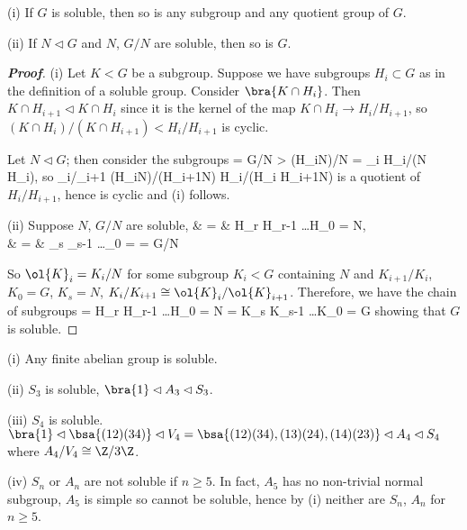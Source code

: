 \begin{proposition}
\ben
\item [(i)] If $G$ is soluble, then so is any subgroup and any quotient group of $G$.
\item [(ii)] If $N \lhd G$ and $N$, $G/N$ are soluble, then so is $G$.
\een
\end{proposition}

\begin{proof}[\bf Proof]
\ben
\item [(i)] Let $K < G$ be a subgroup. Suppose we have subgroups $H_i \subset G$ as in the definition of a soluble group. Consider $\bra{K \cap H_i}$. Then $K \cap H_{i+1} \lhd K \cap H_i$ since it is the kernel of the map $K \cap H_i \to H_i/H_{i+1}$, so $(K \cap H_i)/(K \cap H_{i+1}) < H_i/H_{i+1}$ is cyclic.

Let $N \lhd G$; then consider the subgroups
\be
{} = G/N > (H_iN)/N = _i \cong H_i/(N \cap H_i),
\ee
so
\be
{}_i/_{i+1} \cong (H_iN)/(H_{i+1}N) \cong H_i/(H_i \cap H_{i+1}N)
\ee
is a quotient of $H_i/H_{i+1}$, hence is cyclic and (i) follows.

\item [(ii)] Suppose $N$, $G/N$ are soluble,
\beast
{} & = & H_r \lhd H_{r-1} \lhd \dots \lhd H_0 = N,\\
 & = & _s \lhd {}_{s-1} \lhd \dots {}_0 =  = G/N
\eeast

So $\ol{K}_i = K_i/N$ for some subgroup $K_i < G$ containing $N$ and $K_{i+1} / K_i$, $K_0 = G$, $K_s = N$, $K_i/K_{i+1} \cong \ol{K}_i/\ol{K}_{i+1}$. Therefore, we have the chain of subgroups
\be
{} = H_r \lhd H_{r-1} \lhd \dots \lhd H_0 = N = K_s \lhd K_{s-1} \lhd \dots \lhd K_0 = G
\ee
showing that $G$ is soluble.
\een
\end{proof}

\begin{example}
\ben
\item [(i)] Any finite abelian group is soluble.
\item [(ii)] $S_3$ is soluble, $\bra{1} \lhd A_3 \lhd S_3$.
\item [(iii)] $S_4$ is soluble. $\bra{1} \lhd \bsa{(12)(34)} \lhd V_4 = \bsa{(12)(34), (13)(24), (14)(23)} \lhd A_4 \lhd S_4$ where $A_4/V_4 \cong \Z/3\Z$.
\item [(iv)] $S_n$ or $A_n$ are not soluble if $n \geq 5$. In fact, $A_5$ has no non-trivial normal subgroup, $A_5$ is simple so cannot be soluble, hence by (i) neither are $S_n$, $A_n$ for $n \geq  5$.
\een
\end{example}

